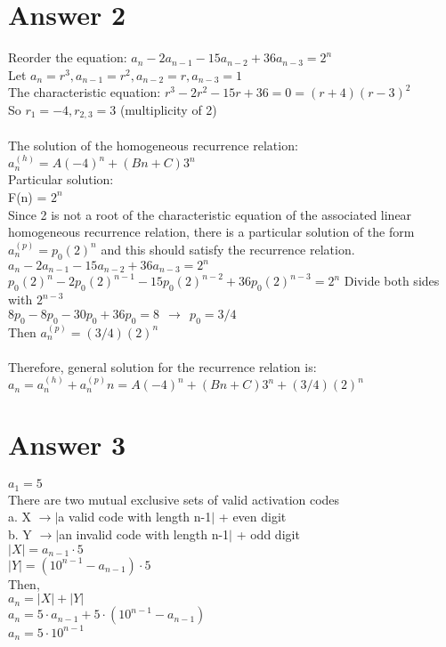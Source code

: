 \documentclass[11pt]{article}
\begin{document}
\section*{Answer 2}
Reorder the equation:
$a_n-2a_{n-1}-15a_{n-2}+36a_{n-3} = 2^n$\\
Let $a_n = r^3, a_{n-1} = r^2, a_{n-2} = r, a_{n-3} = 1$\\
The characteristic equation: $r^3-2r^2-15r+36 = 0 = (r+4)(r-3)^2$\\
So $r_1 = -4, r_{2,3} = 3$ (multiplicity of 2)\\\\
The solution of the homogeneous recurrence relation:\\
$a_n^{(h)} = A(-4)^n + (Bn+C)3^n$\\
Particular solution:\\
F(n) = $2^n$\\
Since 2 is not a root of the characteristic equation of the associated linear homogeneous recurrence relation, there is a particular solution of the form\\
$a_n^{(p)} = p_0(2)^n$ and this should satisfy the recurrence relation.\\
$a_n-2a_{n-1}-15a_{n-2}+36a_{n-3} = 2^n$\\
$ p_0(2)^n - 2p_0(2)^{n-1} - 15p_0(2)^{n-2} + 36p_0(2)^{n-3} = 2^n$ \:\:\:Divide both sides with $2^{n-3}$\\
$8p_0 - 8p_0 - 30p_0 + 36p_0 = 8 \:\:\rightarrow\:\: p_0 = 3/4$\\
Then $a_n^{(p)} = (3/4)(2)^n$\\\\
Therefore, general solution for the recurrence relation is:\\
$a_n = a_n^{(h)} + a_n^{(p)}n = A(-4)^n + (Bn+C)3^n + (3/4)(2)^n$

\newpage

\section*{Answer 3}
$a_1 = 5$\\
There are two mutual exclusive sets of valid activation codes\\
a. X $\rightarrow |$a valid code with length n-1$|$ + even digit\\
b. Y $\rightarrow |$an invalid code with length n-1$|$ + odd digit\\
$|X| = a_{n-1}\cdot5$\\
$|Y| = (10^{n-1}-a_{n-1})\cdot5$\\
Then,\\
$a_n = |X|+|Y|$\\
$a_n = 5\cdot a_{n-1} + 5\cdot (10^{n-1}-a_{n-1})$\\
$a_n = 5\cdot10^{n-1}$\\
\end{document}
